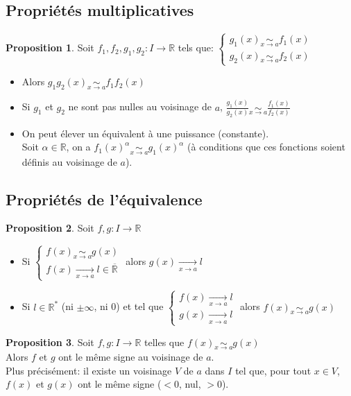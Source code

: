 \documentclass[10pt,a4paper]{article}
\theoremstyle{definition}
\newtheorem{proposition}{Proposition}[section]
\DeclareMathOperator*{\eqv}{\sim}
\begin{document}
\subsection{Propriétés multiplicatives}
\begin{proposition}
Soit $f_1, f_2, g_1, g_2: I \to \mathbb{R}$ tels que: $\begin{cases}
g_1(x) \eqv\limits_{x \to a} f_1(x) \\
g_2(x) \eqv\limits_{x \to a} f_2(x)
\end{cases}$
\begin{itemize}
\item Alors $g_1 g_2 (x) \eqv\limits_{x \to a} f_1 f_2 (x)$
\item Si $g_1$ et $g_2$ ne sont pas nulles au voisinage de $a$, $\frac{g_1(x)}{g_2(x)} \eqv\limits_{x \to a} \frac{f_1(x)}{f_2(x)}$
\item On peut élever un équivalent à une puissance (constante). \\
Soit $\alpha \in \mathbb{R}$, on a $f_1(x)^\alpha \eqv\limits_{x \to a} g_1(x)^\alpha$ (à conditions que ces fonctions soient définis au voisinage de $a$).
\end{itemize}
\end{proposition}

\subsection{Propriétés de l'équivalence}
\begin{proposition}
Soit $f, g: I \to \mathbb{R}$
\begin{itemize}
\item Si $\begin{cases}
f(x) \eqv\limits_{x \to a} g(x) \\
f(x) \xrightarrow[x \to a]{} l \in \overline{\mathbb{R}}
\end{cases}$ alors $g(x) \xrightarrow[x \to a]{} l$
\item Si $l \in \mathbb{R}^*$ (ni $\pm\infty$, ni 0) et tel que $\begin{cases}
f(x) \xrightarrow[x \to a]{} l \\
g(x) \xrightarrow[x \to a]{} l
\end{cases}$ alors $f(x) \eqv\limits_{x \to a} g(x)$
\end{itemize}
\end{proposition}
\begin{proposition}
Soit $f,g: I \to \mathbb{R}$ telles que $f(x) \eqv\limits_{x \to a} g(x)$ \\
Alors $f$ et $g$ ont le même signe au voisinage de $a$. \\
Plus précisément: il existe un voisinage $V$ de $a$ dans $I$ tel que, pour tout $x \in V$, $f(x)$ et $g(x)$ ont le même signe ($<0$, nul, $>0$).
\end{proposition}
\end{document}
